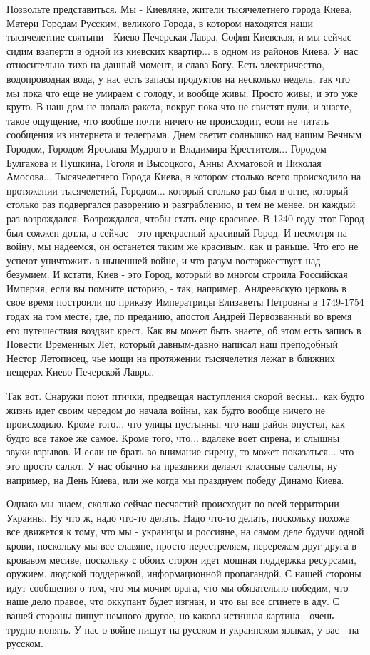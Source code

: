Позвольте представиться. Мы - Киевляне, жители тысячелетнего города Киева,
Матери Городам Русским, великого Города, в котором находятся наши тысячелетние
святыни - Киево-Печерская Лавра, София Киевская, и мы сейчас сидим взаперти в
одной из киевских квартир... в одном из районов Киева. У нас относительно тихо
на данный момент, и слава Богу. Есть электричество, водопроводная вода, у нас
есть запасы продуктов на несколько недель, так что мы пока что еще не умираем с
голоду, и вообще живы. Просто живы, и это уже круто. В наш дом не попала
ракета, вокруг пока что не свистят пули, и знаете, такое ощущение, что вообще
почти ничего не происходит, если не читать сообщения из интернета и телеграма.
Днем светит солнышко над нашим Вечным Городом, Городом Ярослава Мудрого и
Владимира Крестителя... Городом Булгакова и Пушкина, Гоголя и Высоцкого, Анны
Ахматовой и Николая Амосова...  Тысячелетнего Города Киева, в котором столько
всего происходило на протяжении тысячелетий, Городом... который столько раз был
в огне, который столько раз подвергался разорению и разграблению, и тем не
менее, он каждый раз возрождался. Возрождался, чтобы стать еще красивее. В 1240
году этот Город был сожжен дотла, а сейчас - это прекрасный красивый Город. И
несмотря на войну, мы надеемся, он останется таким же красивым, как и раньше.
Что его не успеют уничтожить в нынешней войне, и что разум восторжествует над
безумием.  И кстати, Киев - это Город, который во многом строила Российская
Империя, если вы помните историю, - так, например, Андреевскую церковь в свое
время построили по приказу Императрицы Елизаветы Петровны в 1749-1754 годах на
том месте, где, по преданию, апостол Андрей Первозванный во время его
путешествия воздвиг крест.  Как вы может быть знаете, об этом есть запись в
Повести Временных Лет, который давным-давно написал наш преподобный Нестор
Летописец, чье мощи на протяжении тысячелетия лежат в ближних пещерах
Киево-Печерской Лавры.

Так вот. Снаружи поют птички, предвещая наступления скорой весны... как будто
жизнь идет своим чередом до начала войны, как будто вообще ничего не
происходило. Кроме того...  что улицы пустынны, что наш район опустел, как
будто все такое же самое. Кроме того, что... вдалеке воет сирена, и слышны
звуки взрывов.  И если не брать во внимание сирену, то может показаться... что
это просто салют. У нас обычно на праздники делают классные салюты, ну
например, на День Киева, или же когда мы празднуем победу Динамо Киева.

Однако мы знаем, сколько сейчас несчастий происходит по всей территории
Украины. Ну что ж, надо что-то делать. Надо что-то делать, поскольку похоже все
движется к тому, что мы - украинцы и россияне, на самом деле будучи одной
крови, поскольку мы все славяне, просто перестреляем, перережем друг друга в
кровавом месиве, поскольку с обоих сторон идет мощная поддержка ресурсами,
оружием, людской поддержкой, информационной пропагандой. С нашей стороны идут
сообщения о том, что мы мочим врага, что мы обязательно победим, что наше дело
правое, что оккупант будет изгнан, и что вы все сгинете в аду. С вашей стороны
пишут немного другое, но какова истинная картина - очень трудно понять. У нас о
войне пишут на русском и украинском языках, у вас - на русском.

